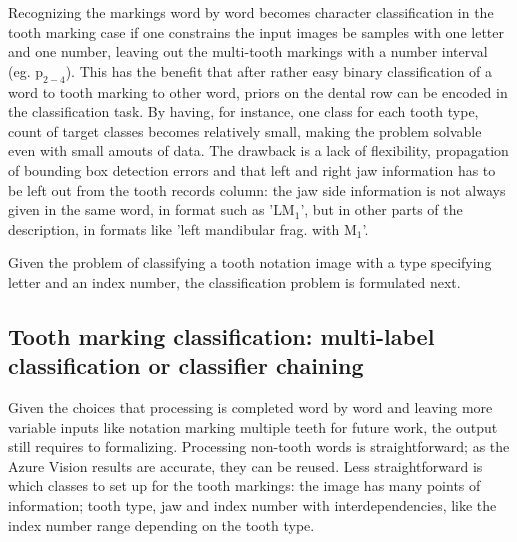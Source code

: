 \documentclass[english,twoside,openright]{UH_DS_MSc}
\begin{document}
Recognizing the markings word by word becomes character classification in 
the tooth marking case if one constrains the input images be samples with one letter and 
one number, leaving out the multi-tooth markings with a number interval (eg. $\text{p}_{2-4}$).
This has the benefit that after rather easy binary classification of a word to 
tooth marking to other word, priors on the dental row can be encoded in the classification
task. By having, for instance, one class for each tooth type, count of target classes becomes
relatively small, making the problem solvable even with small amouts of data.
The drawback is a lack of flexibility, propagation of 
bounding box detection errors and that left and right jaw information has to be left out from 
the tooth records column: the jaw side information is not always given in the same word, 
in format such as '$\text{LM}_1$', but in other parts of the description, in formats like
 'left mandibular frag. with $\text{M}_1$'.

Given the problem of classifying a tooth notation image with a type specifying letter and an index 
number, the classification problem is formulated next.

\subsection{Tooth marking classification: multi-label classification or classifier chaining}

Given the choices that processing is completed word by word and leaving more variable inputs like 
notation marking multiple teeth for future work, the output still requires to formalizing.
Processing non-tooth words is straightforward; as the Azure Vision results are accurate, they
can be reused. Less straightforward is which classes to set up for the 
tooth markings: the image has many points of information; tooth type, jaw and index number with 
interdependencies, like the index number range depending on the tooth type.
\end{document}

